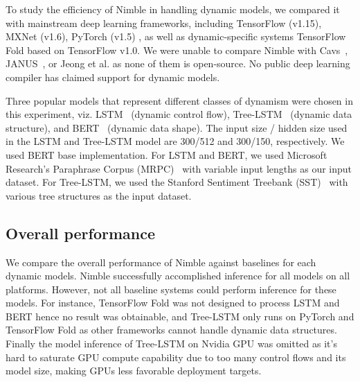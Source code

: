 To study the efficiency of Nimble in handling dynamic models, we compared it with mainstream deep learning frameworks, including TensorFlow (v1.15), MXNet (v1.6), PyTorch (v1.5) \footnotemark, as well as dynamic-specific systems TensorFlow Fold based on TensorFlow v1.0.
We were unable to compare Nimble with Cavs~\citep{xu2018cavs}, JANUS~\citep{jeong2019janus}, or Jeong et al.\citep{jeong2018improving} as none of them is open-source. No public deep learning compiler has claimed support for dynamic models.

Three popular models that represent different classes of dynamism were chosen in this experiment, viz. LSTM~\citep{lstm} (dynamic control flow), Tree-LSTM~\citep{tree_lstm} (dynamic data structure), and BERT~\citep{devlin2018bert} (dynamic data shape).
The input size / hidden size used in the LSTM and Tree-LSTM model are 300/512 and 300/150, respectively.
We used BERT base implementation.
For LSTM and BERT, we used Microsoft Research's Paraphrase Corpus (MRPC)~\citep{dolan2005microsoft} with variable input lengths as our input dataset. For Tree-LSTM, we used the Stanford Sentiment Treebank (SST)~\citep{socher2013recursive} with various tree structures as the input dataset.

\subsection{Overall performance}
\label{sec:eval:overall}
We compare the overall performance of Nimble against baselines for each dynamic models. Nimble successfully accomplished inference for all models on all platforms. However, not all baseline systems could perform inference for these models. For instance, TensorFlow Fold was not designed to process LSTM and BERT hence no result was obtainable, and Tree-LSTM only runs on PyTorch and TensorFlow Fold as other frameworks cannot handle dynamic data structures. Finally the model inference of Tree-LSTM on Nvidia GPU was omitted as it's hard to saturate GPU compute capability due to too many control flows and its model size, making GPUs less favorable deployment targets.

